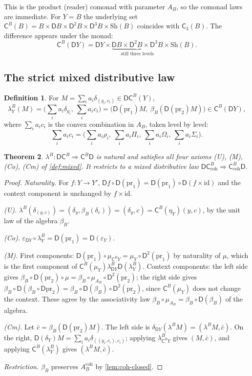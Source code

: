 \documentclass[11pt]{article}
\newtheorem{theorem}{Theorem}[section]
\theoremstyle{definition}
\newtheorem{definition}[theorem]{Definition}
\theoremstyle{remark}
\newcommand{\D}{\mathsf{D}}
\newcommand{\Sh}{\mathrm{Sh}}
\newcommand{\C}{\mathsf{C}}
\newcommand{\id}{\mathrm{id}}
\begin{document}
This is the product (reader) comonad with parameter $A_B$, so the comonad laws are immediate. For
$Y=B$ the underlying set $\C^B(B)=B\times\D B\times\D^2B\times\D^3B\times\Sh(B)$ coincides with
$\C_3(B)$. The difference appears under the monad:
\[
\C^B(\D Y)=\D Y\times\underbrace{\D B\times\D^2B\times\D^3B}_{\text{still three levels}}\times\Sh(B).
\]

\subsection{The strict mixed distributive law}

\begin{definition}
For $M=\sum_ia_i\delta_{(y_i,c_i)}\in\D\C^B(Y)$,
\[
\lambda^B_Y(M)=\Big(\sum_ia_i\delta_{y_i},\ \sum_ia_ic_i\Big)
=\big(\D(\mathrm{pr}_1)M,\ \beta_B(\D(\mathrm{pr}_2)M)\big)\in\C^B(\D Y),
\]
where $\sum_ia_ic_i$ is the convex combination in $A_B$, taken level by level:
\[
\textstyle\sum_ia_ic_i=\big(\sum_i a_i\rho_i,\ \sum_i a_i\Pi_i,\ \sum_i a_i\Omega_i,\ \sum_i a_i\Sigma_i\big).
\]
\end{definition}

\begin{theorem}\label{thm:relative-law}
$\lambda^B\colon\D\C^B\Rightarrow\C^B\D$ is natural and satisfies all four axioms (U), (M), (Co),
(Cm) of \cref{def:mixed}. It restricts to a mixed distributive law $\D\C^B_{\mathrm{coh}}\Rightarrow
\C^B_{\mathrm{coh}}\D$.
\end{theorem}
\begin{proof}
\emph{Naturality.} For $f\colon Y\to Y'$, $\D f\circ\D(\mathrm{pr}_1)=\D(\mathrm{pr}_1)\circ\D(f\times\id)$
and the context component is unchanged by $f\times\id$.

\emph{(U).} $\lambda^B(\delta_{(y,c)})=(\delta_y,\beta_B(\delta_c))=(\delta_y,c)=\C^B(\eta_Y)(y,c)$, by the
unit law of the algebra $\beta_B$.

\emph{(Co).} $\varepsilon_{\D Y}\circ\lambda^B_Y=\D(\mathrm{pr}_1)=\D(\varepsilon_Y)$.

\emph{(M).} First components: $\D(\mathrm{pr}_1)\circ\mu_{\C^BY}=\mu_Y\circ\D^2(\mathrm{pr}_1)$ by
naturality of $\mu$, which is the first component of $\C^B(\mu_Y)\lambda^B_{\D Y}\D(\lambda^B_Y)$.
Context components: the left side gives
$\beta_B\circ\D(\mathrm{pr}_2)\circ\mu=\beta_B\circ\mu_{A_B}\circ\D^2(\mathrm{pr}_2)$; the right side gives
$\beta_B\circ\D(\beta_B\circ\D\mathrm{pr}_2)=\beta_B\circ\D(\beta_B)\circ\D^2(\mathrm{pr}_2)$, since
$\C^B(\mu_Y)$ does not change the context. These agree by the associativity law
$\beta_B\circ\mu_{A_B}=\beta_B\circ\D(\beta_B)$ of the algebra.

\emph{(Cm).} Let $\bar c=\beta_B(\D(\mathrm{pr}_2)M)$. The left side is
$\delta_{\D Y}(\lambda^BM)=(\lambda^BM,\bar c)$. On the right,
$\D(\delta_Y)M=\sum_ia_i\delta_{((y_i,c_i),c_i)}$; applying $\lambda^B_{\C^BY}$ gives $(M,\bar c)$, and
applying $\C^B(\lambda^B_Y)$ gives $(\lambda^BM,\bar c)$.

\emph{Restriction.} $\beta_B$ preserves $A^{\mathrm{coh}}_B$ by \cref{lem:coh-closed}.
\end{proof}
\end{document}
